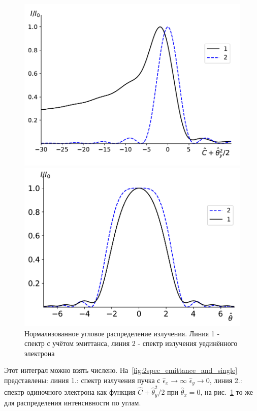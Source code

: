 \begin{figure}[h!]
	\centering  
	\begin{minipage}{0.49\textwidth}
		\centering
		\includegraphics[width=\textwidth]{pic/spec_integ_emittance.pdf}
		\caption{Нормализованный спектр ондуляторного излучения. Линия 1 - спектр с учётом эмиттанса, линия 2 - спектр излучения уединённого электрона}
		\label{fig:2spec_emittance_and_single}
	\end{minipage}\hfill
	\begin{minipage}{0.49\textwidth}
		\centering
		\includegraphics[width=\textwidth]{pic/angle_integ_emittance.pdf}
		\caption{Нормализованное угловое распределение излучения. Линия 1 - спектр с учётом эмиттанса, линия 2 - спектр излучения уединённого электрона}
		\label{fig:spec}
	\end{minipage}    
\end{figure}
Этот интеграл можно взять числено. %
На~\ref{fig:2spec_emittance_and_single} представлены: линия 1.: спектр излучения пучка с $\hat{\epsilon}_x\rightarrow \infty$  $\hat{\epsilon}_y\rightarrow 0$, линия 2.: спектр одиночного электрона как функция $\hat{C} + \hat{\theta}_y^2/2$ при $\hat{\theta}_x = 0$, на рис.~\ref{fig:spec} то же для распределения интенсивности по углам. 

